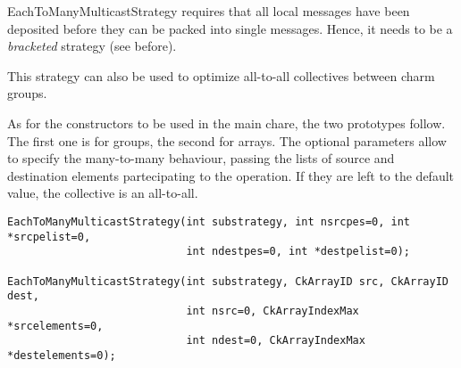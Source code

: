 {%

EachToManyMulticastStrategy requires that all local messages have been deposited
before they can be packed into single messages. Hence, it needs to be a {\em
bracketed} strategy (see before).

This strategy can also be used to optimize all-to-all collectives between charm
groups.




As for the constructors to be used in the main chare, the two prototypes follow.
The first one is for groups, the second for arrays. The optional parameters
allow to specify the many-to-many behaviour, passing the lists of source and
destination elements partecipating to the operation. If they are left to the
default value, the collective is an all-to-all.

\begin{verbatim}
EachToManyMulticastStrategy(int substrategy, int nsrcpes=0, int *srcpelist=0,
                            int ndestpes=0, int *destpelist=0);

EachToManyMulticastStrategy(int substrategy, CkArrayID src, CkArrayID dest,
                            int nsrc=0, CkArrayIndexMax *srcelements=0,
                            int ndest=0, CkArrayIndexMax *destelements=0);
\end{verbatim}

}
